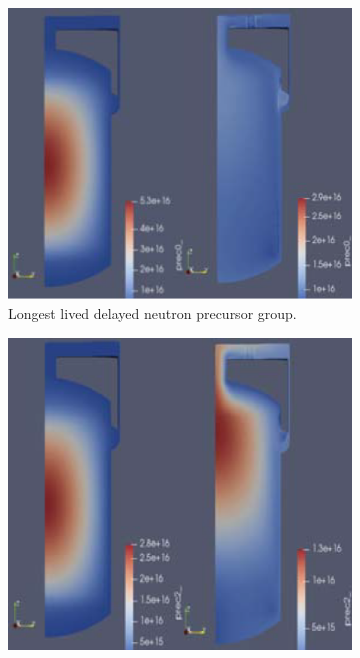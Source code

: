 \begin{figure}[H]
\centering
\begin{subfigure}{0.4\textwidth}
    \includegraphics[scale=0.25]{images/dnp1.PNG}
    \caption{Longest lived delayed neutron precursor group.}
    \label{fig:first}
\end{subfigure}
\hfill
\centering
\begin{subfigure}{0.4\textwidth}
    \includegraphics[scale=0.25]{images/dnp3.PNG}

\end{subfigure}
\end{figure}
